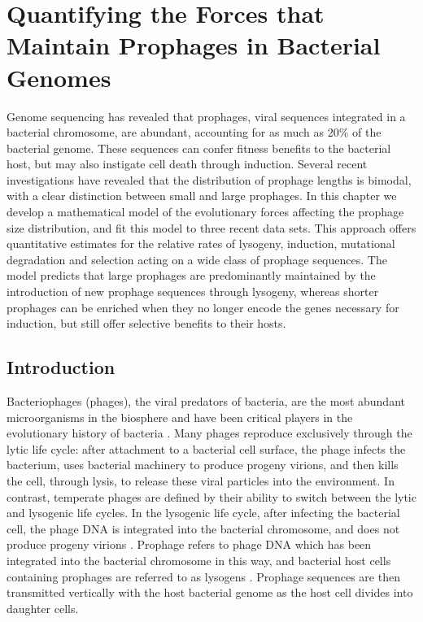 \chapter{Quantifying the Forces that Maintain Prophages in Bacterial Genomes}
Genome sequencing has revealed that prophages, viral sequences integrated in a bacterial chromosome, are abundant, accounting for as much as 20\% of the bacterial genome.  These sequences
can confer fitness benefits to the bacterial host, but may also instigate cell death through induction.  Several recent investigations have revealed that the distribution of prophage lengths is bimodal, with a clear distinction between small and large prophages. In this chapter we develop a mathematical model of the evolutionary forces affecting the prophage size distribution, and fit this model to three recent data sets.  This approach offers quantitative estimates for the relative rates of lysogeny, induction, mutational degradation and selection acting on a wide class of prophage sequences. The model predicts that large prophages are predominantly maintained by the introduction of new prophage sequences through lysogeny, whereas shorter prophages can be enriched when they no longer encode the genes necessary for induction, but still offer selective benefits to their hosts.  

\section{Introduction}
Bacteriophages (phages), the viral predators of bacteria, are the most abundant microorganisms in the biosphere \citep{clokie_phages_2011} and have been critical players in the evolutionary history of bacteria \citep{stern_phage-host_2011}. Many phages reproduce exclusively through the lytic life cycle: after attachment to a bacterial cell surface, the phage infects the bacterium, uses bacterial machinery to produce progeny virions, and then kills the cell, through lysis, to release these viral particles into the environment.  In contrast, temperate phages are defined by their ability to switch between the lytic and lysogenic life cycles.  In the lysogenic life cycle, after infecting the bacterial cell, the phage DNA is integrated into the bacterial chromosome, and does not produce progeny virions \citep{howard-varona_lysogeny_2017}. Prophage refers to phage DNA which has been integrated into the bacterial chromosome in this way, and bacterial host cells containing prophages are referred to as lysogens \citep{weinbauer_ecology_2004}. Prophage sequences are then transmitted vertically with the host bacterial genome as the host cell divides into daughter cells.  

